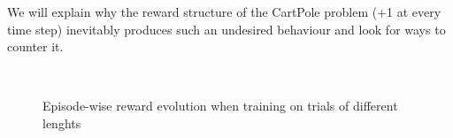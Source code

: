 We will explain why the reward structure of the CartPole problem (+1 at
every time step) inevitably produces such an undesired behaviour and look
for ways to counter it.
\begin{figure}
	\centering
	\\
	\caption{Episode-wise reward evolution when training on trials of 
	different lenghts}
	\label{fig:20permsLR_training}
\end{figure}

